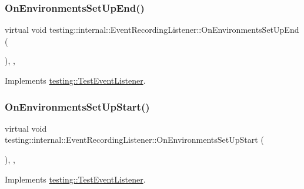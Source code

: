 \subsubsection{\texorpdfstring{OnEnvironmentsSetUpEnd()}{OnEnvironmentsSetUpEnd()}}
{\footnotesize\ttfamily virtual void testing\+::internal\+::\+Event\+Recording\+Listener\+::\+On\+Environments\+Set\+Up\+End (\begin{DoxyParamCaption}\item[{const \mbox{\hyperlink{classtesting_1_1UnitTest}{Unit\+Test}} \&}]{ }\end{DoxyParamCaption})\hspace{0.3cm}{\ttfamily [inline]}, {\ttfamily [protected]}, {\ttfamily [virtual]}}



Implements \mbox{\hyperlink{classtesting_1_1TestEventListener_aaa1021d75f5dbf3f05c829c1cc520341}{testing\+::\+Test\+Event\+Listener}}.

\mbox{\label{classtesting_1_1internal_1_1EventRecordingListener_add61e6e7ebffb8afc90ccabcdc9f9982}} 
\subsubsection{\texorpdfstring{OnEnvironmentsSetUpStart()}{OnEnvironmentsSetUpStart()}}
{\footnotesize\ttfamily virtual void testing\+::internal\+::\+Event\+Recording\+Listener\+::\+On\+Environments\+Set\+Up\+Start (\begin{DoxyParamCaption}\item[{const \mbox{\hyperlink{classtesting_1_1UnitTest}{Unit\+Test}} \&}]{ }\end{DoxyParamCaption})\hspace{0.3cm}{\ttfamily [inline]}, {\ttfamily [protected]}, {\ttfamily [virtual]}}



Implements \mbox{\hyperlink{classtesting_1_1TestEventListener_aa6502e534919605be45f26a6daf9a40c}{testing\+::\+Test\+Event\+Listener}}.

\mbox{\label{classtesting_1_1internal_1_1EventRecordingListener_acd5a3dc070265166a7da68222031fd61}} 
